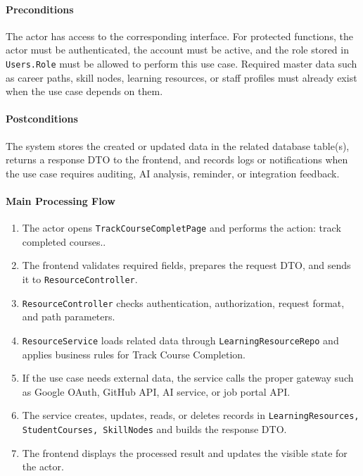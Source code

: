 \paragraph{Preconditions}

The actor has access to the corresponding interface. For protected functions, the actor must be authenticated, the account must be active, and the role stored in \texttt{Users.Role} must be allowed to perform this use case. Required master data such as career paths, skill nodes, learning resources, or staff profiles must already exist when the use case depends on them.

\paragraph{Postconditions}

The system stores the created or updated data in the related database table(s), returns a response DTO to the frontend, and records logs or notifications when the use case requires auditing, AI analysis, reminder, or integration feedback.

\paragraph{Main Processing Flow}

\begin{enumerate}
    \item The actor opens \texttt{TrackCourseCompletPage} and performs the action: track completed courses..
    \item The frontend validates required fields, prepares the request DTO, and sends it to \texttt{ResourceController}.
    \item \texttt{ResourceController} checks authentication, authorization, request format, and path parameters.
    \item \texttt{ResourceService} loads related data through \texttt{LearningResourceRepo} and applies business rules for Track Course Completion.
    \item If the use case needs external data, the service calls the proper gateway such as Google OAuth, GitHub API, AI service, or job portal API.
    \item The service creates, updates, reads, or deletes records in \texttt{LearningResources, StudentCourses, SkillNodes} and builds the response DTO.
    \item The frontend displays the processed result and updates the visible state for the actor.
\end{enumerate}

